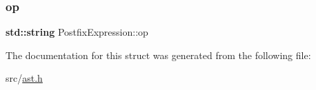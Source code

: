\mbox{\label{struct_postfix_expression_a9ce1fb591d6787626d2eda8a9ca0a3cd}} 
\subsubsection{\texorpdfstring{op}{op}}
{\footnotesize\ttfamily \textbf{ std\+::string} Postfix\+Expression\+::op}



The documentation for this struct was generated from the following file\+:\begin{DoxyCompactItemize}
\item 
src/\hyperlink{ast_8h}{ast.\+h}\end{DoxyCompactItemize}
